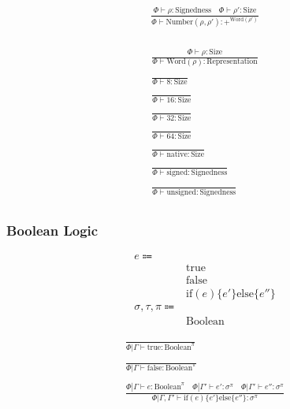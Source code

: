 \documentclass {article}
\begin{document}
\begin{gather*}
\frac
{\Phi \vdash \rho : \text{Signedness} \quad \Phi \vdash \rho' : \text{Size}}
{\Phi \vdash \text{Number} (\rho, \rho') : +^ {\text{Word} (\rho')} } \\
\end{gather*}

\begin{gather*}
\frac
{\Phi \vdash \rho : \text{Size}}
{\Phi \vdash \text{Word} (\rho) : \text{Representation}} \\
\\
\frac
{}
{\Phi \vdash 8 : \text{Size}} \\
\\
\frac
{}
{\Phi \vdash 16 : \text{Size}} \\
\\
\frac
{}
{\Phi \vdash 32 : \text{Size}} \\
\\
\frac
{}
{\Phi \vdash 64 : \text{Size}} \\
\\
\frac
{}
{\Phi \vdash \text{native} : \text{Size}} \\
\\
\frac
{}
{\Phi \vdash \text{signed} : \text{Signedness}} \\
\\
\frac
{}
{\Phi \vdash \text{unsigned} : \text{Signedness}} \\
\end{gather*}

\subsubsection{Boolean Logic}
\begin{align*}
e \Coloneqq & \\
& \text{true} \\
& \text{false} \\
& \text{if} (e) \{ e' \} \text{else} \{ e'' \} \\
\sigma, \tau, \pi \Coloneqq & \\
& \text{Boolean}
\end{align*}

\begin{gather*}
\frac
{}
{ \Phi | \Gamma \vdash \text{true} : \text{Boolean}^\pi} \\
\\
\frac
{}
{ \Phi | \Gamma \vdash \text{false} : \text{Boolean}^\pi} \\
\\
\frac
{\Phi | \Gamma \vdash e : \text{Boolean}^\pi \quad \Phi | \Gamma' \vdash e' : \sigma^\pi \quad \Phi | \Gamma' \vdash e'' : \sigma^\pi }
{\Phi | \Gamma, \Gamma' \vdash \text{if} (e) \{ e' \} \text{else} \{ e'' \} : \sigma^\pi }
\end{gather*}
\end{document}
